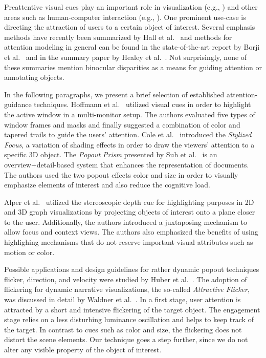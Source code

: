 \documentclass[journal]{vgtc}                %
\begin{document}
Preattentive visual cues play an important role in visualization (e.g., \cite{ware2012information}) and other areas such as human-computer interaction (e.g., \cite{malamed2009visual}). One prominent use-case is directing the attraction of users to a certain object of interest. Several emphasis methods have recently been summarized by Hall et al.~\cite{Hall:2016:FEI} and methods for attention modeling in general can be found in the state-of-the-art report by Borji et al.~\cite{Borji:2013:SAV} and in the summary paper by Healey et al.~\cite{Healey:2012:AVM:2225054.2225226}. Not surprisingly, none of these summaries mention binocular disparities as a means for guiding attention or annotating objects. 

In the following paragraphs, we present a brief selection of established attention-guidance techniques. Hoffmann et al.~\cite{Hoffmann:2008:EVC:1357054.1357199} utilized visual cues in order to highlight the active window in a multi-monitor setup. The authors evaluated five types of window frames and masks and finally suggested a combination of color and tapered trails to guide the users' attention. Cole et al.~\cite{Cole:2006:DGM:2383894.2383942} introduced the \textit{Stylized Focus}, a variation of shading effects in order to draw the viewers' attention to a specific 3D object. The \textit{Popout Prism} presented by Suh et al.~\cite{Suh:2002:PPA:503376.503422} is an overview+detail-based system that enhances the representation of documents. The authors used the two popout effects color and size in order to visually emphasize elements of interest and also reduce the cognitive load. 

Alper et al.~\cite{Alper:2011:SHG:2068462.2068634} utilized the stereoscopic depth cue for highlighting purposes in 2D and 3D graph visualizations by projecting objects of interest onto a plane closer to the user. Additionally, the authors introduced a juxtaposing mechanism to allow focus and context views. The authors also emphasized the benefits of using highlighing mechanisms that do not reserve important visual attributes such as motion or color.

Possible applications and design guidelines for rather dynamic popout techniques flicker, direction, and velocity were studied by Huber et al.~\cite{huber2005visualizing}. The adoption of flickering for dynamic narrative visualizations, the so-called \textit{Attractive Flicker}, was discussed in detail by Waldner et al.~\cite{Waldner:2014:AFG}. In a first stage, user attention is attracted by a short and intensive flickering of the target object. The engagement stage relies on a less disturbing luminance oscillation and helps to keep track of the target. In contrast to cues such as color and size, the flickering does not distort the scene elements. Our technique goes a step further, since we do not alter any visible property of the object of interest.
\end{document}

